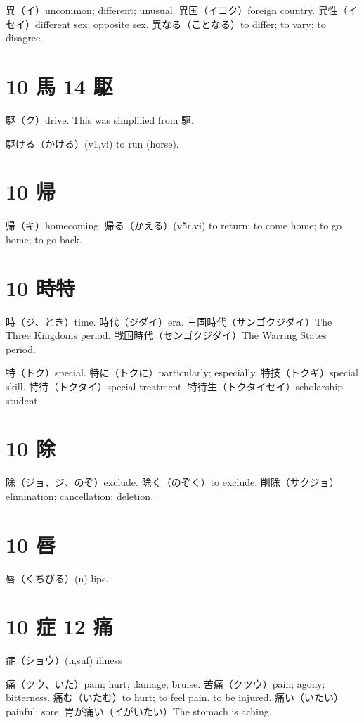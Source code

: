 異（イ）uncommon; different; unusual.
異国（イコク）foreign country.
異性（イセイ）different sex; opposite sex.
異なる（ことなる）to differ; to vary; to disagree.

\section{10 馬 14 駆}

駆（ク）drive.
This was simplified from 驅.

駆ける（かける）(v1,vi) to run (horse).

\section{10 帰}

帰（キ）homecoming.
帰る（かえる）(v5r,vi)
to return; to come home; to go home; to go back.

\section{10 時特}

時（ジ、とき）time.
時代（ジダイ）era.
三国時代（サンゴクジダイ）The Three Kingdoms period.
戦国時代（センゴクジダイ）The Warring States period.

特（トク）special.
特に（トクに）particularly; especially.
特技（トクギ）special skill.
特待（トクタイ）special treatment.
特待生（トクタイセイ）scholarship student.

\section{10 除}

除（ジョ、ジ、のぞ）exclude.
除く（のぞく）to exclude.
削除（サクジョ）elimination; cancellation; deletion.

\section{10 唇}

唇（くちびる）(n) lips.

\section{10 症 12 痛}

症（ショウ）(n,suf) illness

痛（ツウ、いた）pain; hurt; damage; bruise.
苦痛（クツウ）pain; agony; bitterness.
痛む（いたむ）to hurt; to feel pain. to be injured.
痛い（いたい）painful; sore.
胃が痛い（イがいたい）The stomach is aching.


